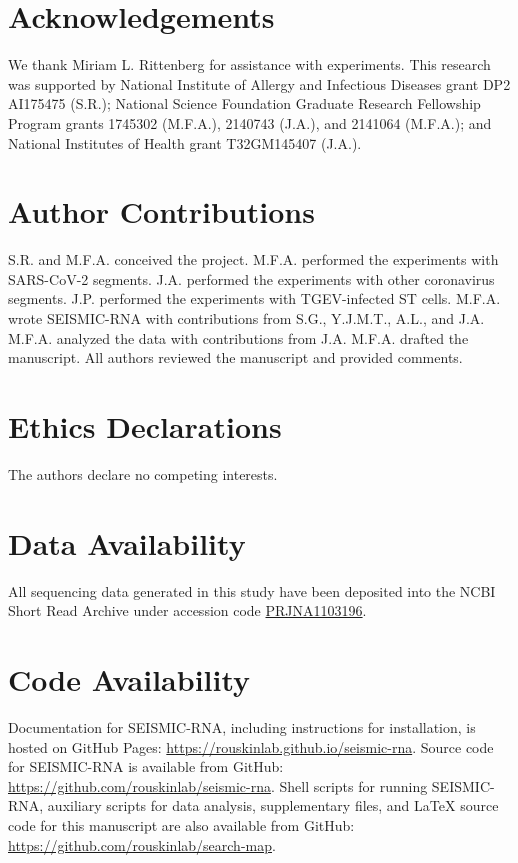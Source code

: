 \documentclass[main.tex]{subfiles}
\begin{document}
\section{Acknowledgements}

We thank Miriam L. Rittenberg for assistance with experiments. 
This research was supported by National Institute of Allergy and Infectious Diseases grant DP2 AI175475 (S.R.); National Science Foundation Graduate Research Fellowship Program grants 1745302 (M.F.A.), 2140743 (J.A.), and 2141064 (M.F.A.); and National Institutes of Health grant T32GM145407 (J.A.).


\section{Author Contributions}

S.R. and M.F.A. conceived the project.
M.F.A. performed the experiments with SARS-CoV-2 segments.
J.A. performed the experiments with other coronavirus segments.
J.P. performed the experiments with TGEV-infected ST cells.
M.F.A. wrote SEISMIC-RNA with contributions from S.G., Y.J.M.T., A.L., and J.A.
M.F.A. analyzed the data with contributions from J.A.
M.F.A. drafted the manuscript.
All authors reviewed the manuscript and provided comments.


\section{Ethics Declarations}

The authors declare no competing interests.


\section{Data Availability}

All sequencing data generated in this study have been deposited into the NCBI Short Read Archive under accession code \href{https://www.ncbi.nlm.nih.gov/bioproject/PRJNA1103196}{PRJNA1103196}.


\section{Code Availability}

Documentation for SEISMIC-RNA, including instructions for installation, is hosted on GitHub Pages: \url{https://rouskinlab.github.io/seismic-rna}.
Source code for SEISMIC-RNA is available from GitHub: \url{https://github.com/rouskinlab/seismic-rna}. 
Shell scripts for running SEISMIC-RNA, auxiliary scripts for data analysis, supplementary files, and LaTeX source code for this manuscript are also available from GitHub: \url{https://github.com/rouskinlab/search-map}.
\end{document}
